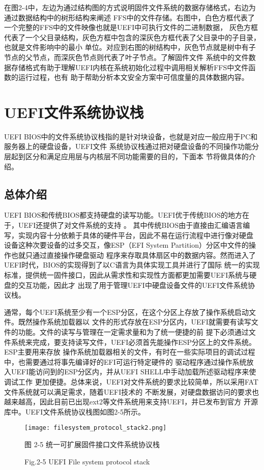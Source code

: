 在图2-4中，左边为通过结构图的方式说明固件文件系统的数据存储格式，右边为通过数据结构中的树形结构来阐述
FFS中的文件存储。右图中，白色方框代表了一个完整的FFS中的文件映像也就是UEFI中可执行文件的二进制数据，
灰色方框代表了一个父目录结构，灰色方框中包含的深灰色方框代表了父目录中的子目录，也就是文件影响中的最小
单位。对应到右图的树结构中，灰色节点就是树中有子节点的父节点，而深灰色节点则代表了叶子节点。了解固件文件
系统中的文件数据存储格式有助于理解UEFI内核在系统初始化过程中调用相关解析FFS中文件函数的运行过程，也有
助于帮助分析本文安全方案中可信度量的具体数据内容。
%
%
\section{UEFI文件系统协议栈}
UEFI BIOS中的文件系统协议栈指的是针对块设备，也就是对应一般应用于PC和服务器上的硬盘设备，UEFI文件
系统协议栈通过把对硬盘设备的不同操作功能分层起到区分和满足应用层与内核层不同功能需要的目的，下面本
节将做具体的介绍。
\subsection{总体介绍}
UEFI BIOS和传统BIOS都支持硬盘的读写功能。UEFI优于传统BIOS的地方在于，UEFI还提供了对文件系统的支持
\cite{english18}。
其中传统BIOS由于直接由汇编语言编写，实现内容十分依赖于具体的硬件平台，因此不易在运行流程中进行像对硬盘
设备这种次要设备的过多交互，像ESP（EFI System Partition）分区中文件的操作也就只通过直接操作硬盘驱动
程序来存取具体扇区中的数据内容。然而进入了UEFI时代，BIOS的实现得到了以C语言为具体实现工具并进行了国际
统一的实现标准，提供统一固件接口，因此从需求性和实现性方面都更加需要UEFI系统与硬盘的交互功能，因此才
出现了用于管理UEFI中硬盘设备文件的UEFI文件系统协议栈。
\par 通常，每个UEFI系统至少有一个ESP分区，在这个分区上存放了操作系统启动文件。既然操作系统加载器以
文件的形式存放在ESP分区内，UEFI就需要有读写文件的功能。文件的读写与管理在一定需求量和为了统一便捷的前
提下必须通过文件系统来完成，要支持读写文件，UEFI必须首先能操作ESP分区上的文件系统。ESP主要用来存放
操作系统加载器相关的文件，有时在一些实际项目的调试过程中，也需要通过将事先编译好的EFI可运行特定硬件的
驱动程序通过操作系统放入UEFI能访问到的ESP分区内，并从UEFI SHELL中手动加载所述驱动程序来使调试工作
更加便捷。总体来说，UEFI对文件系统的要求比较简单，所以采用FAT文件系统就可以满足需求，随着UEFI技术的
不断发展，对硬盘数据访问的要求也越来越高，因此目前已出现ext2等文件系统用来支持UEFI，并已发布到官方
开源库中。UEFI文件系统协议栈图如图2-5所示。

\begin{figure}[htb]
    \vspace{0cm}   
    \setlength{\abovecaptionskip}{0.3cm}  
	\centering
    \texttt{[image: filesystem\_protocol\_stack2.png]}
    \caption*{图 2-5 统一可扩展固件接口文件系统协议栈}
    \setlength{\belowcaptionskip}{-0.7cm}
    \caption*{Fig.2-5 UEFI File system protocol stack}
\end{figure}


